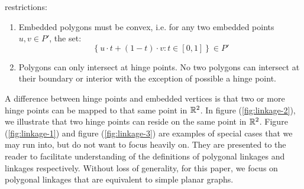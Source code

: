 restrictions:
\begin{enumerate}
\item Embedded polygons must be convex, i.e. for any two embedded points $u,v \in P'$, the set:
$$\left\lbrace u  \cdot t + (1-t) \cdot v : t \in [0,1] \right\rbrace \in P'$$
 \item  Polygons can only intersect at hinge points.  No two polygons can intersect at 
their boundary or interior with the exception of possible a hinge point.  
\end{enumerate}

A difference between hinge points and embedded vertices is that two or more hinge points can be 
mapped to that same point in ${\mathbb{R}}^2$.  In figure (\ref{fig:linkage-2}), we illustrate that two 
hinge points can reside on the same point 
in ${\mathbb{R}}^2$. Figure (\ref{fig:linkage-1}) and figure (\ref{fig:linkage-3}) are examples of special 
cases that we may run into, but do not want to focus heavily on.  They are presented to the reader 
to facilitate understanding of the definitions of polygonal linkages and linkages respectively.  
Without loss of generality, for this paper, we focus on polygonal linkages that are 
equivalent to simple planar graphs.
